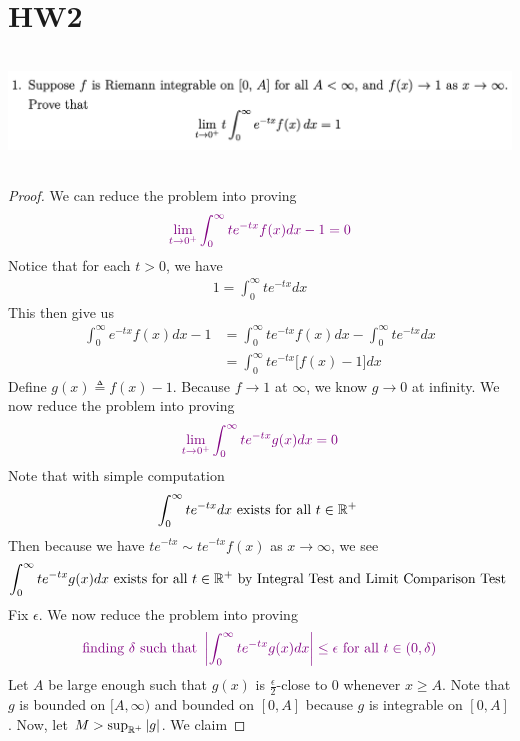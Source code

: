 \documentclass{report}
\begin{document}
\section{HW2}
\begin{question}{}{}
\includegraphics[height=3cm,width=18cm]{ahw23}
\end{question}
\begin{proof}
We can reduce the problem into proving 
\begin{align*}
\textcolor{violet}{\lim_{t\to 0^+}\int_0^\infty te^{-tx}f(x)dx-1=0}
\end{align*}
Notice that for each $t>0$, we have 
 \begin{align*}
1=\int_0^\infty te^{-tx}dx
\end{align*}
This then give us 
\begin{align*}
\int_0^\infty e^{-tx}f(x)dx-1&=\int_0^\infty te^{-tx}f(x)dx-\int_0^\infty te^{-tx}dx\\
&=\int_0^\infty te^{-tx}\big[f(x)-1 \big]dx
\end{align*}
Define $g(x)\triangleq f(x)-1$. Because $f\to 1$ at $\infty$, we know $g \to 0$ at infinity. We now reduce the problem into proving 
\begin{align*}
\textcolor{violet}{\lim_{t\to 0^+}\int_0^\infty te^{-tx}g(x)dx=0}
\end{align*}
Note that with simple computation 
\begin{align*}
\int_0^\infty te^{-tx}dx\text{ exists for all $t\in\mathbb{R}^+$ }
\end{align*}
Then because we have $te^{-tx}\sim te^{-tx}f(x)$ as $x \to \infty$, we see 
\begin{align*}
\int_0^\infty te^{-tx}g(x)dx\text{ exists for all $t\in\mathbb{R}^+$ by Integral Test and Limit Comparison Test
}
\end{align*}
Fix $\epsilon $. We now reduce the problem into proving 
\begin{align*}
\textcolor{violet}{\text{ finding $\delta$ such that }\left|\int_0^\infty te^{-tx}g(x)dx\right|\leq \epsilon \text{ for all $t\in (0,\delta)$ }}
\end{align*}
Let $A$ be large enough such that $g(x)$ is  $\frac{\epsilon}{2}$-close to $0$ whenever $x\geq A$. Note that $g$ is bounded on $[A,\infty)$ and bounded on $[0,A]$ because $g$ is integrable on $[0,A]$. Now, let $M>\sup_{\mathbb{R}^+}\left|g\right|$. We claim

\end{proof}
\end{document}
